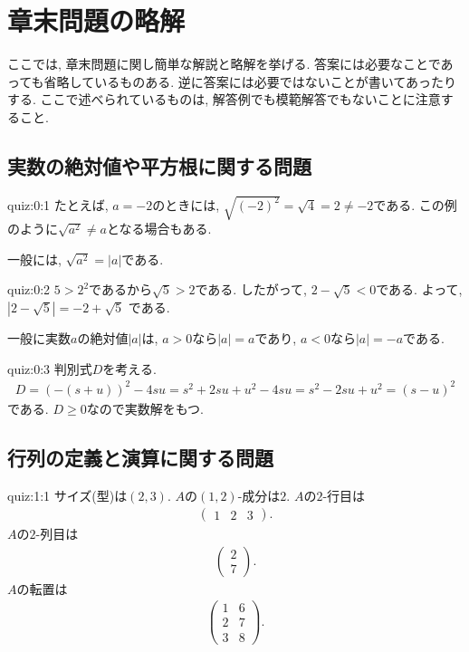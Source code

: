

\chapter{章末問題の略解}

ここでは, 章末問題に関し簡単な解説と略解を挙げる.
答案には必要なことであっても省略しているものある.
逆に答案には必要ではないことが書いてあったりする.
ここで述べられているものは,
解答例でも模範解答でもないことに注意すること.


\section{実数の絶対値や平方根に関する問題}
\begin{answerof}{quiz:0:1}
  たとえば, $a=-2$のときには,
  $\sqrt{(-2)^2}=\sqrt{4}=2\neq -2$である.
  この例のように$\sqrt{a^2}\neq a$となる場合もある.  

  一般には, $\sqrt{a^2}=|a|$である.
\end{answerof}

\begin{answerof}{quiz:0:2}
  $5>2^2$であるから$\sqrt{5}>2$である.
  したがって, $2-\sqrt{5}<0$である.
  よって,
  $|2-\sqrt{5}|=-2+\sqrt{5}$
  である.

  一般に実数$a$の絶対値$|a|$は,
  $a>0$なら$|a|=a$であり,
  $a<0$なら$|a|=-a$である.
\end{answerof}

\begin{answerof}{quiz:0:3}
  判別式$D$を考える.
  \begin{align*}
    D=(-(s+u))^2-4su=s^2+2su+u^2-4su=s^2-2su+u^2=(s-u)^2
  \end{align*}
  である.  $D\geq 0$なので実数解をもつ.
\end{answerof}

\section{行列の定義と演算に関する問題}

\begin{answerof}{quiz:1:1}
  サイズ(型)は$(2,3)$.
  $A$の$(1,2)$-成分は$2$.
  $A$の$2$-行目は
  \begin{align*}\begin{pmatrix}1&2&3\end{pmatrix}.\end{align*}
  $A$の$2$-列目は
  \begin{align*}\begin{pmatrix}2\\7\end{pmatrix}.\end{align*}
  $A$の転置は
  \begin{align*}\begin{pmatrix}1&6\\2&7\\3&8\end{pmatrix}.\end{align*}
\end{answerof}

